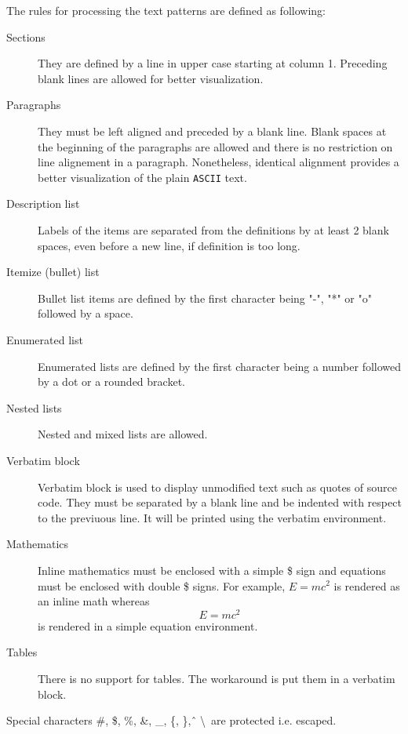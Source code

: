 \documentclass[10pt,notitlepage]{article}
\begin{document}
The rules for processing the text patterns are defined as following:
\begin{description}
\item[Sections] They are defined by a line in upper case starting at column 1.
                Preceding blank lines are allowed for better visualization.
\item[Paragraphs] They must be left aligned and preceded by a blank line.
                  Blank spaces at the beginning of the paragraphs are allowed
                  and there is no restriction on line alignement in a paragraph.
                  Nonetheless, identical alignment provides a better visualization
                  of the plain \texttt{ASCII} text. 
\item[Description list] 
                        Labels of the items are separated from the definitions
                        by at least 2 blank spaces, even before a new line, if
                        definition is too long.
\item[Itemize (bullet) list] 
                             Bullet list items are defined by the first character being "-",
                             "*" or "o" followed by a space.
\item[Enumerated list] 
                       Enumerated lists are defined by the first character being 
                       a number followed by a dot or a rounded bracket.
\item[Nested lists] 
                    Nested and mixed lists are allowed.
\item[Verbatim block] 
                      Verbatim block is used to display unmodified text such as 
                      quotes of source code.
                      They must be separated by a blank line and be indented 
                      with respect to the previuous line.
                      It will be printed using the verbatim environment.
\item[Mathematics] 
                   Inline mathematics must be enclosed with a simple \$ sign
                   and equations must be enclosed with double \$ signs.
                   For example, $E=mc^2$ is rendered as an inline math whereas 
$$ E=mc^2 $$
                   is rendered in a simple equation environment.
\item[Tables] 
              There is no support for tables.
              The workaround is put them in a verbatim block.
\end{description}

Special characters \#, \$, \%, \&, \_, \{, \}, \^\, \textbackslash\ are protected i.e. escaped.
\end{document}

